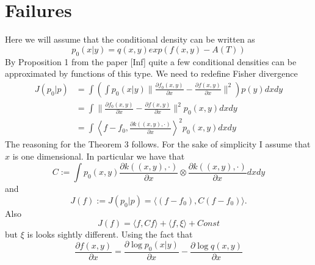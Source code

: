\documentclass[10pt]{article}
\begin{document}
\section{Failures}
\label{sec:fail}
Here we will assume that the conditional density can be written as 
\begin{equation}
p_0(x|y) = q(x,y)exp(f(x,y) - A(T))
\end{equation} 
By Proposition 1 from the paper [Inf] quite a few conditional densities can be approximated by functions of this type. We need to redefine Fisher divergence   
\begin{align}
J(p_0|p) &= \int \left( \int p_0(x|y) \parallel \frac{\partial  f_0(x,y)} {\partial x} -\frac{\partial  f(x,y)} {\partial x} \parallel^2 \right )p(y) dx dy  \\
&=  \int  \parallel \frac{\partial  f_0(x,y)} {\partial x} -\frac{\partial  f(x,y)} {\partial x} \parallel^2 p_0(x,y) dx dy \\
&=  \int   \left \langle f-f_0,\frac{\partial  k( (x,y), \cdot)} {\partial x} \right \rangle^2    p_0(x,y) dx dy
\end{align}
The reasoning for the Theorem 3 follows. For the sake of simplicity I assume that $x$ is one dimensional. In particular we have that 
\begin{equation}
 C := \int  p_0(x,y) \frac{\partial  k( (x,y), \cdot)} {\partial x} \otimes \frac{\partial  k( (x,y), \cdot)} {\partial x} dx dy
\end{equation}
and 
\begin{equation}
 J(f) := J(p_0|p) = \langle (f -f_0),C(f -f_0) \rangle.
\end{equation}
Also 
\begin{equation}
 J(f) = \langle f,Cf \rangle + \langle f,\xi \rangle + Const
\end{equation}
but $\xi$ is looks sightly different. Using the fact that
\begin{equation}
 \frac{\partial  f(x,y)} {\partial x}  = \frac{\partial  \log p_0(x|y)}{\partial x} - \frac{\partial  \log q(x,y)}{\partial x}
\end{equation}
\end{document}
